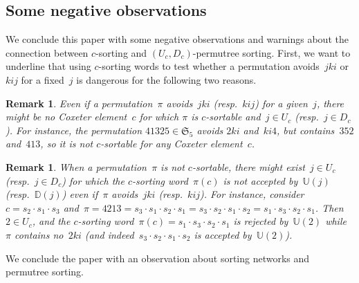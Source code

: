 \documentclass{amsart}
\newtheorem{remark}[theorem]{Remark}
\newcommand{\fS}{\mathfrak{S}} %
\newcommand{\automatonU}{\mathbb{U}} %
\newcommand{\automatonD}{\mathbb{D}} %
\begin{document}
\subsection{Some negative observations}

We conclude this paper with some negative observations and warnings about the connection between $c$-sorting and $(U_c,D_c)$-permutree sorting.
First, we want to underline that using $c$-sorting words to test whether a permutation avoids~$jki$ or $kij$ for a fixed~$j$ is dangerous for the following two reasons.

\begin{remark}
Even if a permutation~$\pi$ avoids~$jki$ (resp.~$kij$) for a given~$j$, there might be no Coxeter element~$c$ for which $\pi$ is $c$-sortable and~$j \in U_c$ (resp.~$j \in D_c$).
For instance, the permutation $41325 \in \fS_5$ avoids $2ki$ and~$ki4$, but contains~$352$ and~$413$, so it is not $c$-sortable for any Coxeter element~$c$.
\end{remark}

\begin{remark}
When a permutation~$\pi$ is not $c$-sortable, there might exist~$j \in U_c$ (resp.~$j \in D_c$) for which the $c$-sorting word~$\pi(c)$ is not accepted by~$\automatonU(j)$ (resp.~$\automatonD(j)$) even if~$\pi$ avoids~$jki$ (resp.~$kij$).
For instance, consider~$c = s_2 \cdot s_1 \cdot s_3$ and~$\pi = 4213 = s_3 \cdot s_1 \cdot s_2 \cdot s_1 =  s_3 \cdot s_2 \cdot s_1 \cdot s_2 =  s_1 \cdot s_3 \cdot s_2 \cdot s_1$.
Then~$2 \in U_c$, and the $c$-sorting word~$\pi(c) = s_1 \cdot s_3 \cdot s_2 \cdot s_1$ is rejected by~$\automatonU(2)$ while~$\pi$ contains no~$2ki$ (and indeed~$s_3 \cdot s_2 \cdot s_1 \cdot s_2$ is accepted by~$\automatonU(2)$).
\end{remark}

We conclude the paper with an observation about sorting networks and permutree sorting.
\end{document}
